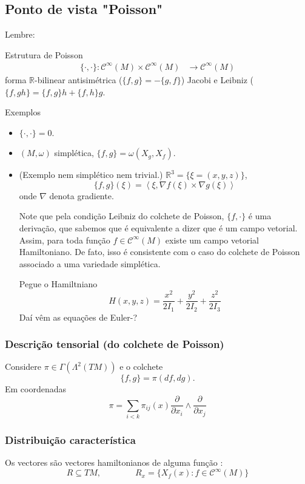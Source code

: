 \subsection{Ponto de vista "Poisson"}

Lembre:
 \begin{idea7}{Estrutura de Poisson}\leavevmode
 	\begin{align*}
 		\{\cdot,\cdot\}: \mathcal{C}^\infty(M)\times \mathcal{C}^\infty(M) &\longrightarrow \mathcal{C}^\infty(M)
 	\end{align*}
	forma $ \mathbb{R}$-bilinear antisimétrica ($\{f,g\} =-\{g,f\}$) Jacobi e Leibniz ($\{f,gh\} =\{f,g\} h+\{f,h\} g$.
 \end{idea7}

\begin{idea6}{Exemplos}\leavevmode
	\begin{itemize}
	\item $\{\cdot,\cdot\} =0$.
	\item $(M,\omega)$ simplética, $\{f,g\} =\omega(X_g,X_f)$.
	\item (Exemplo nem simplético nem trivial.) $\mathbb{R}^{3}=\{\xi=(x,y,z)\}$,
		\[\{f,g\}(\xi)=\left<\xi,\nabla f(\xi)\times \nabla g(\xi)\right> \]
		onde $\nabla$ denota gradiente.

		Note que pela condição Leibniz do colchete de Poisson, $\{f,\cdot\}$ é uma derivação, que sabemos que é equivalente a dizer que é um campo vetorial. Assim, para toda função $f\in\mathcal{C}^\infty(M)$ existe um campo vetorial Hamiltoniano. De fato, isso é consistente com o caso do colchete de Poisson associado a uma variedade simplética.

		Pegue o Hamiltniano
		\[H(x,y,z)=\frac{x^2}{2I_1}+\frac{y^2}{2I_2}+\frac{z^2}{2I_3}\]
		Daí vêm as equações de Euler-?
	\end{itemize}
\end{idea6}

\subsubsection{Descrição tensorial (do colchete de Poisson)}

Considere $\pi \in\Gamma(\Lambda^{2}(TM))$ e o colchete
\[\{f,g\} =\pi(df,dg).\]
Em coordenadas
\[\pi=\sum_{i<k}\pi_{ij}(x)\frac{\partial }{\partial x_i}\wedge \frac{\partial }{\partial x_j}\]

\subsubsection{Distribuição característica}
Os vectores são vectores  hamiltonianos de alguma função :
\[R\subseteq TM,\qquad \qquad R_x=\{X_f(x):f\in\mathcal{C}^\infty(M)\}\]

